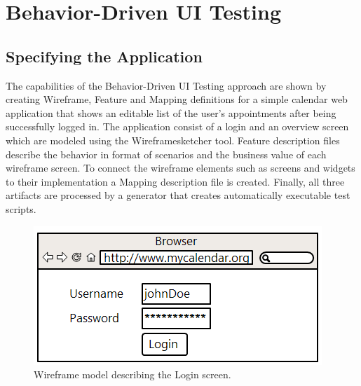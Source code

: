 \documentclass{sig-alternate-05-2015}
\begin{document}

\section{Behavior-Driven UI Testing}\label{sec:SpecificationDrivenUITesting}
\subsection{Specifying the Application}\label{sec:SpecifyingTheApplication} 
The capabilities of the Behavior-Driven UI Testing approach are shown by creating Wireframe, Feature and Mapping definitions for a simple calendar web application that shows an editable list of the user's appointments after being successfully logged in.
The application consist of a login and an overview screen which are modeled using the Wireframesketcher tool.
Feature description files describe the behavior in format of scenarios and the business value of each wireframe screen.
To connect the wireframe elements such as screens and widgets to their implementation a Mapping description file is created.
Finally, all three artifacts are processed by a generator that creates automatically executable test scripts.

\begin{figure}[h]
	\centering
	\includegraphics[width=0.8\linewidth]{Login.png}
	\caption{Wireframe model describing the Login screen.}
	\label{fig:login}
\end{figure}
\end{document}
